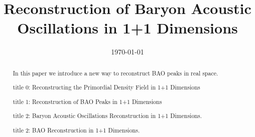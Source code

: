 \documentclass[aps,prd,twocolumn,showpacs,superscriptaddress,groupedaddress,nofootinbib]{revtex4}  %
\begin{document}
\widetext


\title{Reconstruction of Baryon Acoustic Oscillations in 1+1 Dimensions}

%
%
%

\date{\today}

\begin{abstract}
In this paper we introduce a new way to reconstruct BAO peaks in real space.

title 0: Reconstructing the Primordial Density Field in 1+1 Dimensions

title 1: Reconstruction of BAO Peaks in 1+1 Dimensions

title 2: Baryon Acoustic Oscillations Reconstruction in 1+1 Dimensions.

title 2: BAO Reconstruction in 1+1 Dimensions.

\end{abstract}

\pacs{}
\maketitle
\end{document}
